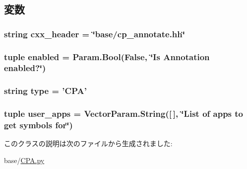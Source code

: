 \subsection{変数}
\hypertarget{classCPA_1_1CPA_a17da7064bc5c518791f0c891eff05fda}{
\subsubsection[{cxx\_\-header}]{\setlength{\rightskip}{0pt plus 5cm}string {\bf cxx\_\-header} = \char`\"{}base/cp\_\-annotate.hh\char`\"{}}}
\label{classCPA_1_1CPA_a17da7064bc5c518791f0c891eff05fda}
\hypertarget{classCPA_1_1CPA_a3c61e7ae7e28cc6dc15dae82fbc92158}{
\subsubsection[{enabled}]{\setlength{\rightskip}{0pt plus 5cm}tuple {\bf enabled} = Param.Bool(False, \char`\"{}Is Annotation {\bf enabled}?\char`\"{})}}
\label{classCPA_1_1CPA_a3c61e7ae7e28cc6dc15dae82fbc92158}
\hypertarget{classCPA_1_1CPA_acce15679d830831b0bbe8ebc2a60b2ca}{
\subsubsection[{type}]{\setlength{\rightskip}{0pt plus 5cm}string {\bf type} = '{\bf CPA}'}}
\label{classCPA_1_1CPA_acce15679d830831b0bbe8ebc2a60b2ca}
\hypertarget{classCPA_1_1CPA_a56430a394857d63e6a4dbb74556dd7bc}{
\subsubsection[{user\_\-apps}]{\setlength{\rightskip}{0pt plus 5cm}tuple {\bf user\_\-apps} = VectorParam.String(\mbox{[}$\,$\mbox{]}, \char`\"{}List of apps to get symbols for\char`\"{})}}
\label{classCPA_1_1CPA_a56430a394857d63e6a4dbb74556dd7bc}


このクラスの説明は次のファイルから生成されました:\begin{DoxyCompactItemize}
\item 
base/\hyperlink{CPA_8py}{CPA.py}\end{DoxyCompactItemize}

